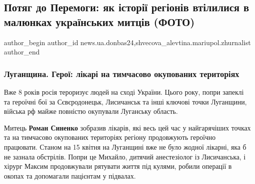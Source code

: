  
 
 
 
 
 
\subsection{Потяг до Перемоги: як історії регіонів втілилися в малюнках українських митців (ФОТО)}
\label{sec:11_09_2022.stz.news.ua.donbas24.1.potjag_do_peremogy}
 
\ifcmt
 author_begin
   author_id news.ua.donbas24,shvecova_alevtina.mariupol.zhurnalist
 author_end
\fi



\subsubsection{Луганщина. Герої: лікарі на тимчасово окупованих територіях}

Вже 8 років росія тероризує людей на сході України. Цього року, попри запеклі
та героїчні бої за Сєвєродонецьк, Лисичанськ та інші ключові точки Луганщини,
війська рф майже повністю окупували Луганську область.

Митець \textbf{Роман Синенко} зобразив лікарів, які весь цей час у найгарячіших точках
та на тимчасово окупованих територіях регіону продовжують героїчно працювати.
Станом на 15 квітня на Луганщині вже не було жодної лікарні, яка б не зазнала
обстрілів. Попри це Михайло, дитячий анестезіолог із Лисичанська, і хірург
Максим продовжували рятувати життя під кулями, робили операції в окопах та
допомагали пацієнтам у підвалах.



